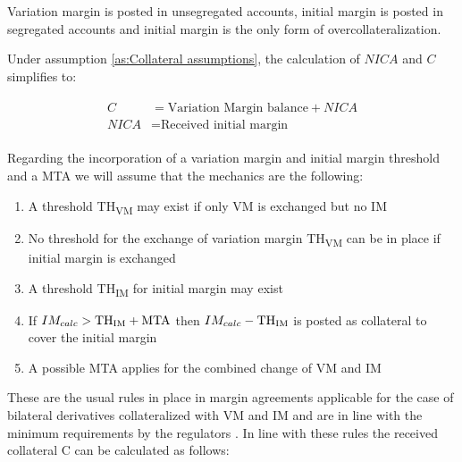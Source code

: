\documentclass[../Thesis_AHoecherl.tex]{subfiles}
\begin{document}
\begin{assumption}\label{as:Collateral assumptions}
Variation margin is posted in unsegregated accounts, initial margin is posted in segregated accounts and initial margin is the only form of overcollateralization.
\end{assumption}

Under assumption \ref{as:Collateral assumptions}, the calculation of \(NICA\) and \(C\) simplifies to:

\begin{align}
	\begin{split}
		C&= \text{Variation Margin balance} + NICA\\ 
		NICA&= \text{Received initial margin}
	\end{split}
\end{align}

Regarding the incorporation of a variation margin and initial margin threshold and a \gls{MTA} we will assume that the mechanics are the following:
\begin{enumerate}
	\item A threshold \gls{TH}\textsubscript{VM} may exist if only \gls{VM} is exchanged but no IM
	\item No threshold for the exchange of variation margin \gls{TH}\textsubscript{VM} can be in place if initial margin is exchanged
	\item A threshold \gls{TH}\textsubscript{IM} for initial margin may exist 
	\item If $ IM_{calc} > \text{TH\textsubscript{IM}} + \text{MTA} $ then $IM_{calc} - \text{TH\textsubscript{IM}} $ is posted as collateral to cover the initial margin
	\item A possible \gls{MTA} applies for the combined change of \gls{VM} and IM
\end{enumerate}

These are the usual rules in place in margin agreements applicable for the case of bilateral derivatives collateralized with \gls{VM} and \gls{IM} and are in line with the minimum requirements by the regulators \cite{BCBS_MarginRequirements}.
In line with these rules the received collateral C can be calculated as follows:
\end{document}
